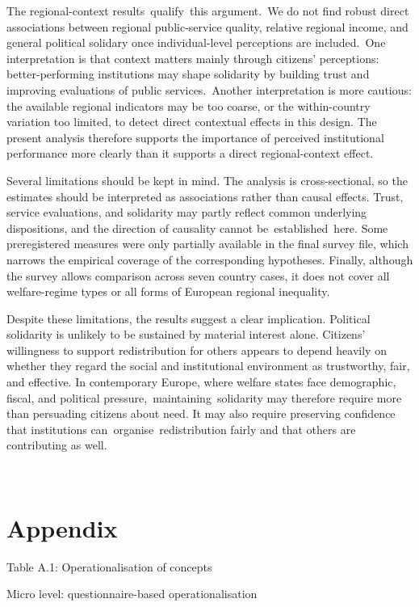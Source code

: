 \documentclass[12pt]{article}
\begin{document}
The regional-context results~qualify~this argument.~We do not find
robust direct associations between regional public-service quality,
relative regional income, and general political solidary once
individual-level perceptions are included.~One interpretation is that
context matters mainly through citizens' perceptions: better-performing
institutions may shape solidarity by building trust and improving
evaluations of public services.~Another interpretation is more cautious:
the available regional indicators may be too coarse, or the
within-country variation too limited, to detect direct contextual
effects in this design. The present analysis therefore supports the
importance of perceived institutional performance more clearly than it
supports a direct regional-context effect.~

Several limitations should be kept in mind. The analysis is
cross-sectional, so the estimates should be interpreted as associations
rather than causal effects. Trust, service evaluations, and solidarity
may partly reflect common underlying dispositions, and the direction of
causality cannot be~established~here. Some preregistered measures were
only partially available in the final survey file, which narrows the
empirical coverage of the corresponding hypotheses. Finally, although
the survey allows comparison across seven country cases, it does not
cover all welfare-regime types or all forms of European regional
inequality.~

Despite these limitations, the results suggest a clear implication.
Political solidarity is unlikely to be sustained by material interest
alone. Citizens' willingness to support redistribution for others
appears to depend heavily on whether they regard the social and
institutional environment as trustworthy, fair, and effective. In
contemporary Europe, where welfare states face demographic, fiscal, and
political pressure,~maintaining~solidarity may therefore require more
than persuading citizens about need. It may also require preserving
confidence that institutions can~organise~redistribution fairly and that
others are contributing as well.~

~

\section{Appendix~}\label{appendix}

Table A.1: Operationalisation of concepts

Micro level: questionnaire-based operationalisation
\end{document}
